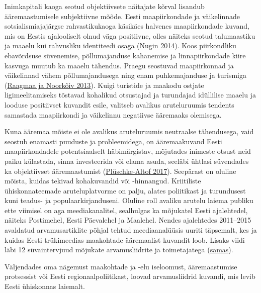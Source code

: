 \documentclass[estonian,]{article}
\begin{document}
Inimkapitali kaoga seotud objektiivsete näitajate kõrval lisandub ääremaastumisele subjektiivne mõõde. Eesti maapiirkondade ja väikelinnade sotsialismiajajärgse rahvastikukaoga käsikäes halvenes maapiirkondade kuvand, mis on Eestis ajalooliselt olnud väga positiivne, olles näiteks seotud talumaastiku ja maaelu kui rahvusliku identiteedi osaga (\protect\hyperlink{Nugin2014}{Nugin 2014}). Koos piirkondliku ebavõrdsuse süvenemise, põllumajanduse kahanemise ja linnapiirkondade kiire kasvuga muutub ka maaelu tähendus. Praegu seostuvad maapiirkonnad ja väikelinnad vähem põllumajandusega ning enam puhkemajanduse ja turismiga (\protect\hyperlink{Raagmaa2013}{Raagmaa ja Noorkõiv 2013}). Kuigi turistide ja maakodu ostjate ligimeelitamiseks tõstavad kohalikud otsustajad ja turundajad idüllilise maaelu ja looduse positiivset kuvandit esile, valitseb avalikus aruteluruumis tendents samastada maapiirkondi ja väikelinnu negatiivse ääremaaks olemisega.

Kuna ääremaa mõiste ei ole avalikus aruteluruumis neutraalse tähendusega, vaid seostub enamasti puuduste ja probleemidega, on ääremaakuvand Eesti maapiirkondadele potentsiaalselt häbimärgistav, mõjutades inimeste otsust neid paiku külastada, sinna investeerida või elama asuda, seeläbi ühtlasi süvendades ka objektiivset ääremaastumist (\protect\hyperlink{Pluxfcschke-Altof2017}{Plüschke-Altof 2017}). Seepärast on oluline mõista, kuidas tekivad kohakuvandid või -hinnangud. Kriitiliste ühiskonnateemade aruteluplatvorme on palju, alates poliitikast ja turundusest kuni teadus- ja populaarkirjanduseni. Oluline roll avaliku arutelu laiema publiku ette viimisel on aga meediakanalitel, sealhulgas ka mõjukatel Eesti ajalehtedel, näiteks Postimehel, Eesti Päevalehel ja Maalehel. Nendes ajalehtedes 2011--2015 avaldatud arvamusartiklite põhjal tehtud meediaanalüüsis uuriti täpsemalt, kes ja kuidas Eesti trükimeedias maakohtade ääremaalist kuvandit loob. Lisaks viidi läbi 12 süvaintervjuud mõjukate arvamusliidrite ja toimetajatega (\protect\hyperlink{Pluxfcschke-Altof2017}{samas}).

\begin{blockquote-left}
Väljendades oma nägemust maakohtade ja -elu iseloomust, ääremaastumise
protsessist või Eesti regionaalpoliitikast, loovad arvamusliidrid
kuvandi, mis levib Eesti ühiskonnas laiemalt.
\end{blockquote-left}
\end{document}
